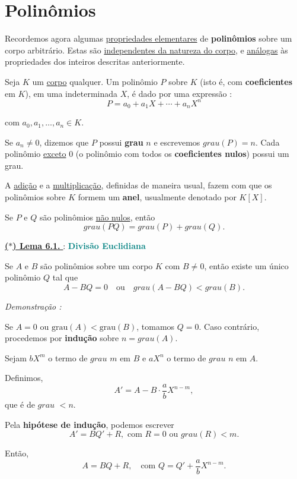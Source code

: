 \section*{Polinômios}

Recordemos agora algumas \underline{propriedades elementares} de \textbf{polinômios} sobre um corpo arbitrário.  
Estas são \underline{independentes da natureza do corpo}, e \underline{análogas} às propriedades dos inteiros descritas anteriormente.  

Seja $K$ um \underline{corpo} qualquer. Um polinômio $P$ sobre $K$ (isto é, com \textbf{coeficientes} em $K$), em uma indeterminada $X$, é dado por uma expressão : 
\[
P = a_0 + a_1 X + \cdots + a_n X^n
\]

com $a_0, a_1, \ldots, a_n \in K$.  

\vspace{0.2cm}
Se $a_n \neq 0$, dizemos que $P$ possui \textbf{grau} $n$ e escrevemos $grau(P) = n$.  
Cada polinômio \underline{exceto} $0$ (o polinômio com todos os \textbf{coeficientes nulos}) possui um grau.  

A \underline{adição} e a \underline{multiplicação}, definidas de maneira usual, fazem com que os polinômios sobre $K$ formem um \textbf{anel}, usualmente denotado por $K[X]$.  

Se $P$ e $Q$ são polinômios \underline{não nulos}, então
\[
\boxed{grau(PQ) = grau(P) + grau(Q)}.
\]

\noindent\underline{\underline{\textbf{($\ast$) Lema 6.1. }}} : \textbf{\textcolor{teal}{Divisão Euclidiana}}

Se $A$ e $B$ são polinômios sobre um corpo $K$ com $B \neq 0$, então existe um único polinômio $Q$ tal que 
\[
\boxed{A - BQ = 0} \quad \text{ou} \quad \boxed{grau(A - BQ) < grau(B)}.
\]

\vspace{0.2cm}
\noindent\textit{Demonstração : }

Se $A = 0$ ou $\text{grau}(A) < \text{grau}(B)$, tomamos $Q = 0$.  
Caso contrário, procedemos por \textbf{indução} sobre $n = grau(A)$.  

Sejam $bX^m$ o termo de $grau$ $m$ em $B$ e $aX^n$ o termo de $grau$ $n$ em $A$.  

Definimos, 
\[
A' = A - B \cdot \frac{a}{b} X^{n-m},
\]
que é de $grau$ $< n$.  

Pela \textbf{hipótese de indução}, podemos escrever
\[
A' = BQ' + R, \text{ com $R = 0$ ou $grau(R) < m$}.
\]

Então,
\[
A = BQ + R, \quad \text{com } Q = Q' + \frac{a}{b} X^{n-m}.
\]

